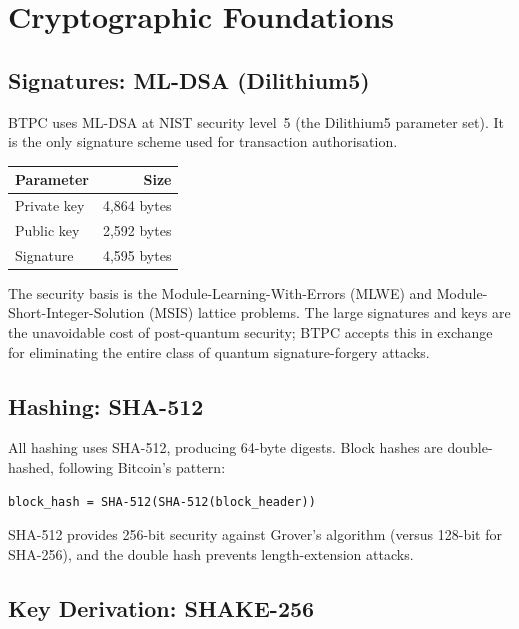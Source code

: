 \documentclass[11pt,a4paper]{article}
\begin{document}
\section{Cryptographic Foundations}

\subsection{Signatures: ML-DSA (Dilithium5)}

BTPC uses ML-DSA at NIST security level~5 (the Dilithium5 parameter set). It is the only signature scheme used for transaction authorisation.

\begin{center}
\begin{tabular}{lr}
\toprule
\textbf{Parameter} & \textbf{Size} \\
\midrule
Private key & 4{,}864 bytes \\
Public key & 2{,}592 bytes \\
Signature & 4{,}595 bytes \\
\bottomrule
\end{tabular}
\end{center}

The security basis is the Module-Learning-With-Errors (MLWE) and Module-Short-Integer-Solution (MSIS) lattice problems. The large signatures and keys are the unavoidable cost of post-quantum security; BTPC accepts this in exchange for eliminating the entire class of quantum signature-forgery attacks.

\subsection{Hashing: SHA-512}

All hashing uses SHA-512, producing 64-byte digests. Block hashes are double-hashed, following Bitcoin's pattern:

\begin{verbatim}
block_hash = SHA-512(SHA-512(block_header))
\end{verbatim}

SHA-512 provides 256-bit security against Grover's algorithm (versus 128-bit for SHA-256), and the double hash prevents length-extension attacks.

\subsection{Key Derivation: SHAKE-256}
\end{document}
